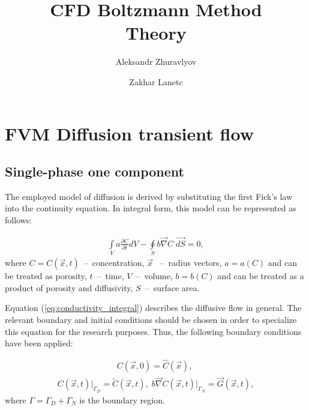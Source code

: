 \documentclass[a4paper,14pt,english]{extreport}
\author{Aleksandr Zhuravlyov \and Zakhar Lanetc}
\title{CFD Boltzmann Method\\Theory}
\date{\DTMnow}
\begin{document}
    \pagecolor{pageColor}
    \color{fontColor}

    \section*{FVM Diffusion transient flow}
    \subsection*{Single-phase one component}
    
The employed model of diffusion is derived by substituting the first Fick's law into the continuity equation. In integral form, this model can be represented as follows:

    \begin{eqnarray}
        \label{eq:conductivity_integral}
        \int \limits_{V} a \frac{\partial C}{\partial t} d V - \oint \limits_{S} b \vec{\nabla}C \; \vec{dS} = 0,
    \end{eqnarray}
    where $C = C\left(\vec{x}, t\right)$~--~concentration, $\vec{x}$ ~--~radius vectors, $a = a\left(C\right)$ and can be treated as porosity, $t$~--~time, $V$~--~volume, $b = b\left(C\right)$ and can be treated as a product of porosity and diffusivity, $S$~--~surface area.
    
Equation (\ref{eq:conductivity_integral}) describes the diffusive flow in general. The relevant boundary and initial conditions should be chosen in order to specialize this equation for the research purposes. Thus, the following boundary conditions have been applied:
    
    \begin{eqnarray}
        \label{eq:conductivity_init}
        C\left(\vec{x}, \mathit{0}\right) = \hat{C}\left(\vec{x}\right), \; 
     \end{eqnarray}
    \begin{eqnarray}
      \label{eq:conductivity_bound}
       C\left(\vec{x}, t\right)\Big|_{\mathit{\Gamma}_D} \!\!= \tilde{C}\left(\vec{x}, t\right), \; b \vec{\nabla}C \left(\vec{x}, t\right)\Big|_{\mathit{\Gamma}_N} \!\!= \vec{G}\left(\vec{x}, t\right),
    \end{eqnarray}
where $\mathit{\Gamma} = \mathit{\Gamma_D} + \mathit{\Gamma_N}$ is the boundary region.
\end{document}
